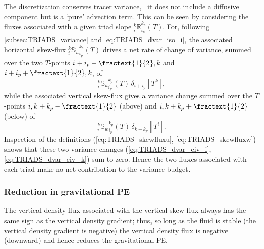\documentclass[../main/NEMO_manual]{subfiles}
\begin{document}
The discretization conserves tracer variance, \ie\ it does not include a diffusive component but is a `pure' advection term.
This can be seen %
by considering the fluxes associated with a given triad slope $_i^k{\mathbb{R}}_{i_p}^{k_p} (T)$.
For, following \autoref{subsec:TRIADS_variance} and \autoref{eq:TRIADS_dvar_iso_i},
the associated horizontal skew-flux $_i^k{\mathbb{S}_u}_{i_p}^{k_p} (T)$ drives a net rate of change of variance,
summed over the two $T$-points $i+i_p-\fractext{1}{2},k$ and $i+i_p+\fractext{1}{2},k$, of
\begin{equation}
  \label{eq:TRIADS_dvar_eiv_i}
  _i^k{\mathbb{S}_u}_{i_p}^{k_p} (T)\,\delta_{i+ i_p}[T^k],
\end{equation}
while the associated vertical skew-flux gives a variance change summed over
the $T$-points $i,k+k_p-\fractext{1}{2}$ (above) and $i,k+k_p+\fractext{1}{2}$ (below) of
\begin{equation}
  \label{eq:TRIADS_dvar_eiv_k}
  _i^k{\mathbb{S}_w}_{i_p}^{k_p} (T) \,\delta_{k+ k_p}[T^i].
\end{equation}
Inspection of the definitions (\autoref{eq:TRIADS_skewfluxu}, \autoref{eq:TRIADS_skewfluxw}) shows that
these two variance changes (\autoref{eq:TRIADS_dvar_eiv_i}, \autoref{eq:TRIADS_dvar_eiv_k}) sum to zero.
Hence the two fluxes associated with each triad make no net contribution to the variance budget.

\subsubsection{Reduction in gravitational PE}

The vertical density flux associated with the vertical skew-flux always has the same sign as
the vertical density gradient;
thus, so long as the fluid is stable (the vertical density gradient is negative)
the vertical density flux is negative (downward) and hence reduces the gravitational PE.
\end{document}
